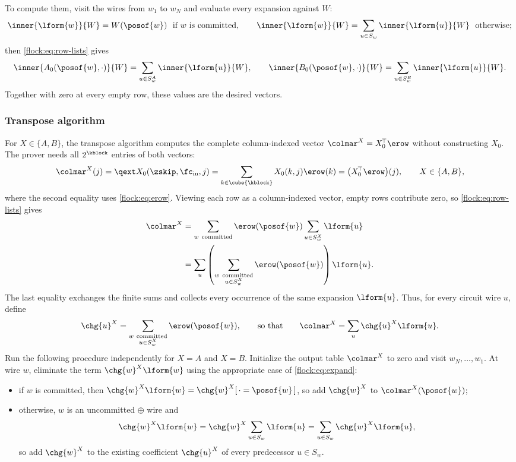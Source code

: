 To compute them, visit the wires from $w_1$ to $w_N$ and evaluate every expansion against $W$:
\[
\inner{\lform{w}}{W}=W(\posof{w})\ \text{ if $w$ is committed},\qquad \inner{\lform{w}}{W}=\sum_{u\in S_w}\inner{\lform{u}}{W}\ \text{ otherwise};
\]
then \eqref{flock:eq:row-lists} gives
\begin{equation}\label{flock:eq:row-pair}
\inner{A_0(\posof{w},\cdot)}{W}=\sum_{u\in S^A_w}\inner{\lform{u}}{W},\qquad \inner{B_0(\posof{w},\cdot)}{W}=\sum_{u\in S^B_w}\inner{\lform{u}}{W}.
\end{equation}
Together with zero at every empty row, these values are the desired vectors.

\subsubsection{Transpose algorithm}\label{flock:backward}

For $X\in\{A,B\}$, the transpose algorithm computes the complete column-indexed vector $\colmar^{X}=X_0^{\!\top}\erow$ without constructing $X_0$. The prover needs all $2^{\kblock}$ entries of both vectors:
\begin{equation}\label{flock:eq:marginal}
\colmar^{X}(j)=\qext X_0(\zskip,\fc_{\mathrm{in}},j)=\sum_{k\in\cube{\kblock}}X_0(k,j)\erow(k)=\bigl(X_0^{\!\top}\erow\bigr)(j),\qquad X\in\{A,B\},
\end{equation}
where the second equality uses \eqref{flock:eq:erow}. Viewing each row as a column-indexed vector, empty rows contribute zero, so \eqref{flock:eq:row-lists} gives
\begin{align*}
\colmar^{X}
&=\sum_{w\ \mathrm{committed}}\erow(\posof{w})\sum_{u\in S^X_w}\lform{u}\\
&=\sum_u\left(\sum_{\substack{w\ \mathrm{committed}\\u\in S^X_w}}\erow(\posof{w})\right)\lform{u}.
\end{align*}
The last equality exchanges the finite sums and collects every occurrence of the same expansion $\lform{u}$. Thus, for every circuit wire $u$, define
\begin{equation*}
\chg{u}^{X}=\sum_{\substack{w\ \mathrm{committed}\\u\in S^X_w}}\erow(\posof{w}),
\qquad \text{so that}\qquad
\colmar^{X}=\sum_u\chg{u}^{X}\lform{u}.
\end{equation*}
Run the following procedure independently for $X=A$ and $X=B$. Initialize the output table $\colmar^{X}$ to zero and visit $w_N,\ldots,w_1$. At wire $w$, eliminate the term $\chg{w}^{X}\lform{w}$ using the appropriate case of \eqref{flock:eq:expand}:
\begin{itemize}
\item if $w$ is committed, then $\chg{w}^{X}\lform{w}=\chg{w}^{X}[\,\cdot=\posof{w}\,]$, so add $\chg{w}^{X}$ to $\colmar^{X}(\posof{w})$;
\item otherwise, $w$ is an uncommitted $\oplus$ wire and
\[
\chg{w}^{X}\lform{w}=\chg{w}^{X}\sum_{u\in S_w}\lform{u}=\sum_{u\in S_w}\chg{w}^{X}\lform{u},
\]
so add $\chg{w}^{X}$ to the existing coefficient $\chg{u}^{X}$ of every predecessor $u\in S_w$.
\end{itemize}

